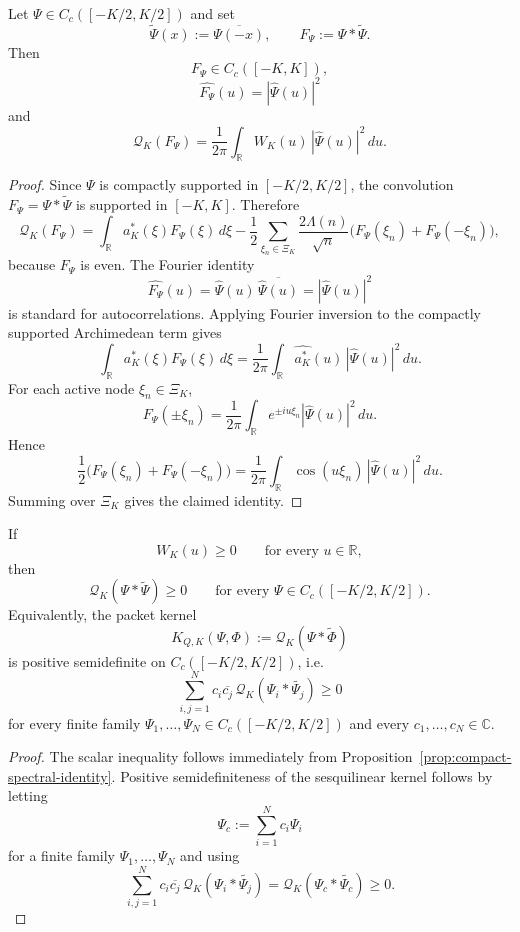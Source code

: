 \begin{proposition}\label{prop:compact-spectral-identity}
Let $\Psi\in C_c([-K/2,K/2])$ and set
\[
  \widetilde\Psi(x):=\overline{\Psi(-x)},
  \qquad
  F_\Psi:=\Psi*\widetilde{\Psi}.
\]
Then
\[
  F_\Psi\in C_c([-K,K]),
\]
\[
  \widehat{F_\Psi}(u)=|\widehat\Psi(u)|^2
\]
and
\[
  \mathcal Q_K(F_\Psi)
  =
  \frac1{2\pi}\int_{\mathbb R} W_K(u)\,|\widehat\Psi(u)|^2\,du.
\]
\end{proposition}

\begin{proof}
Since $\Psi$ is compactly supported in $[-K/2,K/2]$, the convolution
$F_\Psi=\Psi*\widetilde{\Psi}$ is supported in $[-K,K]$. Therefore
\[
  \mathcal Q_K(F_\Psi)
  =
  \int_{\mathbb R} a_K^*(\xi)F_\Psi(\xi)\,d\xi
  -
  \frac12\sum_{\xi_n\in\Xi_K}\frac{2\Lambda(n)}{\sqrt n}
  \bigl(F_\Psi(\xi_n)+F_\Psi(-\xi_n)\bigr),
\]
because $F_\Psi$ is even. The Fourier identity
\[
  \widehat{F_\Psi}(u)=\widehat\Psi(u)\,\overline{\widehat\Psi(u)}
  =|\widehat\Psi(u)|^2
\]
is standard for autocorrelations. Applying Fourier inversion to the compactly
supported Archimedean term gives
\[
  \int_{\mathbb R} a_K^*(\xi)F_\Psi(\xi)\,d\xi
  =
  \frac1{2\pi}\int_{\mathbb R}\widehat{a_K^*}(u)\,|\widehat\Psi(u)|^2\,du.
\]
For each active node $\xi_n\in\Xi_K$,
\[
  F_\Psi(\pm\xi_n)
  =
  \frac1{2\pi}\int_{\mathbb R} e^{\pm iu\xi_n}|\widehat\Psi(u)|^2\,du.
\]
Hence
\[
  \frac12\bigl(F_\Psi(\xi_n)+F_\Psi(-\xi_n)\bigr)
  =
  \frac1{2\pi}\int_{\mathbb R} \cos(u\xi_n)\,|\widehat\Psi(u)|^2\,du.
\]
Summing over $\Xi_K$ gives the claimed identity.
\end{proof}

\begin{proposition}\label{prop:compact-spectral-positivity}
If
\[
  W_K(u)\ge0
  \qquad\text{for every }u\in\mathbb R,
\]
then
\[
  \mathcal Q_K(\Psi*\widetilde{\Psi})\ge0
  \qquad\text{for every }\Psi\in C_c([-K/2,K/2]).
\]
Equivalently, the packet kernel
\[
  K_{Q,K}(\Psi,\Phi):=\mathcal Q_K(\Psi*\widetilde{\Phi})
\]
is positive semidefinite on $C_c([-K/2,K/2])$, i.e.
\[
  \sum_{i,j=1}^N c_i\overline{c_j}\,
  \mathcal Q_K(\Psi_i*\widetilde{\Psi_j})
  \ge0
\]
for every finite family $\Psi_1,\dots,\Psi_N\in C_c([-K/2,K/2])$ and every
$c_1,\dots,c_N\in\mathbb C$.
\end{proposition}

\begin{proof}
The scalar inequality follows immediately from
Proposition~\ref{prop:compact-spectral-identity}. Positive semidefiniteness of
the sesquilinear kernel follows by letting
\[
  \Psi_c:=\sum_{i=1}^N c_i\Psi_i
\]
for a finite family $\Psi_1,\dots,\Psi_N$ and using
\[
  \sum_{i,j=1}^N c_i\overline{c_j}\,
  \mathcal Q_K(\Psi_i*\widetilde{\Psi_j})
  =
  \mathcal Q_K(\Psi_c*\widetilde{\Psi_c})\ge0.
\]
\end{proof}

